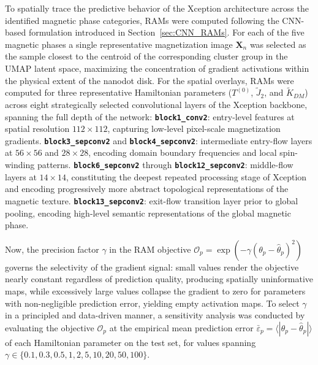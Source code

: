\documentclass[final,5p,times,twocolumn]{elsarticle}
\begin{document}
To spatially trace the predictive behavior of the Xception
architecture across the identified magnetic phase categories,
RAMs were computed following the
CNN-based formulation introduced in
Section~\ref{sec:CNN_RAMs}. For each of the five magnetic
phases a single representative magnetization image
$\mathbf{X}_n$ was selected as the sample closest to the
centroid of the corresponding cluster group in the UMAP
latent space, maximizing the concentration of gradient
activations within the physical extent of the nanodot disk.
For the spatial overlays, RAMs were computed for three
representative Hamiltonian parameters ($T^{(0)}$, $\tilde{J}_2$,
and $\tilde{K}_{DM}$) across eight strategically selected
convolutional layers of the Xception backbone, spanning the
full depth of the network: \textbf{\texttt{block1\_conv2}}: entry-level features
at spatial resolution $112\times112$, capturing
low-level pixel-scale magnetization gradients. \textbf{\texttt{block3\_sepconv2}} and
\textbf{\texttt{block4\_sepconv2}}: intermediate entry-flow
layers at $56\times56$ and $28\times28$, encoding
domain boundary frequencies and local spin-winding
patterns. \textbf{\texttt{block6\_sepconv2}} through
\textbf{\texttt{block12\_sepconv2}}: middle-flow layers at
$14\times14$, constituting the deepest repeated
processing stage of Xception and encoding progressively
more abstract topological representations of the
magnetic texture. \textbf{\texttt{block13\_sepconv2}}: exit-flow
transition layer prior to global pooling, encoding
high-level semantic representations of the global
magnetic phase.

Now, the precision factor $\gamma$ in the RAM objective
$\mathcal{O}_p = \exp\!\left(-\gamma\left(\theta_p -
\hat{\theta}_p\right)^2\right)$ governs the selectivity
of the gradient signal: small values render the objective
nearly constant regardless of prediction quality, producing
spatially uninformative maps, while excessively large values
collapse the gradient to zero for parameters with
non-negligible prediction error, yielding empty activation
maps. To select $\gamma$ in a principled and data-driven
manner, a sensitivity analysis was conducted by evaluating
the objective $\mathcal{O}_p$ at the empirical mean
prediction error $\bar{\varepsilon}_p =
\langle|\theta_p - \hat{\theta}_p|\rangle$ of each
Hamiltonian parameter on the test set, for values spanning
$\gamma \in \{0.1, 0.3, 0.5, 1, 2, 5, 10, 20, 50, 100\}$.
\end{document}
